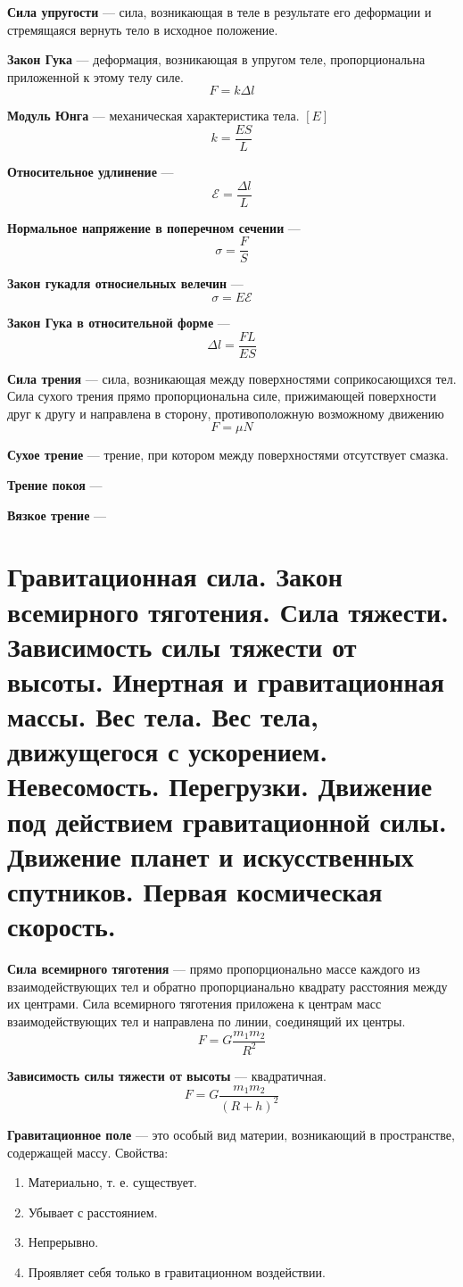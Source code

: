 \documentclass{report}
\begin{document}
{\bf Сила упругости} ---
сила, возникающая в теле в результате его деформации и стремящаяся вернуть тело в исходное положение.

{\bf Закон Гука} ---
деформация, возникающая в упругом теле, пропорциональна приложенной к этому телу силе.
$$
F=k\Delta l
$$

{\bf Модуль Юнга} ---
механическая характеристика тела. $[E]$
$$
k=\frac{ES}{L}
$$

{\bf Относительное удлинение} ---
$$
\mathcal{E}=\frac{\Delta l}{L}
$$

{\bf Нормальное напряжение в поперечном сечении} ---
$$
\sigma=\frac{F}{S}
$$

{\bf Закон гукадля относиельных велечин} ---
$$
\sigma =E\mathcal{E}
$$

{\bf Закон Гука в относительной форме} ---
$$
\Delta l=\frac{FL}{ES}
$$

{\bf Сила трения} ---
сила, возникающая между поверхностями соприкосающихся тел.
Сила сухого трения прямо пропорциональна силе, прижимающей 
поверхности друг к другу и направлена в сторону, противоположную возможному движению
$$
F=\mu N
$$

{\bf Сухое трение} ---
трение, при котором между поверхностями отсутствует смазка. 

{\bf Трение покоя} ---

{\bf Вязкое трение} ---



\part{Гравитационная сила. 
Закон всемирного тяготения. 
Сила тяжести. 
Зависимость силы тяжести от высоты. 
Инертная и гравитационная массы. 
Вес тела. 
Вес тела, движущегося с ускорением. 
Невесомость. 
Перегрузки. 
Движение под действием гравитационной силы. 
Движение планет и искусственных спутников. 
Первая космическая скорость. }

{\bf Сила всемирного тяготения} ---
прямо пропорционально массе каждого из взаимодействующих тел и обратно пропорцианально квадрату
расстояния между их центрами. Сила всемирного тяготения приложена к центрам масс взаимодействующих
тел и направлена по линии, соединящий их центры.
$$
F=G\frac{m_1m_2}{R^2}
$$ 

{\bf Зависимость силы тяжести от высоты} ---
квадратичная.
$$
F=G\frac{m_1m_2}{(R+h)^2}
$$

{\bf Гравитационное поле} ---
это особый вид материи, возникающий в пространстве, содержащей массу. Свойства:
\begin{enumerate}
  \item Материально, т. е. существует.
  \item Убывает с расстоянием.
  \item Непрерывно.
  \item Проявляет себя только в гравитационном воздействии.
\end{enumerate}
\end{document}
